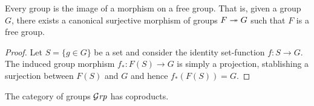 \begin{proposition}
\label{prop:free-group-factorization}
Every group is the image of a morphism on a free group. That is, given a group
\(G\), there exists a canonical surjective morphism of groups \(F \twoheadrightarrow G\)
such that \(F\) is a free group.
\end{proposition}

\begin{proof}
Let \(S = \{g \in G\}\) be a set and consider the identity set-function \(f: S \to
G\). The induced group morphism \(f_{*}: F(S) \to G\) is simply a projection,
stablishing a surjection between \(F(S)\) and \(G\) and hence \(f_{*}(F(S)) =
G\).
\end{proof}

\begin{proposition}
\label{prop:coprod-grp}
The category of groups \({\mathcal{G}\textit{rp}}\) has coproducts.
\end{proposition}

